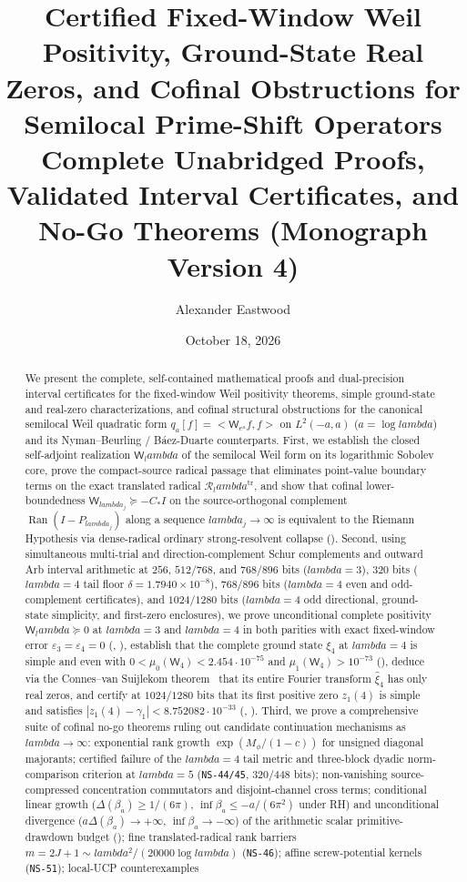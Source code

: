 \documentclass[11pt]{article}
\title{\textbf{Certified Fixed-Window Weil Positivity, Ground-State Real Zeros, and Cofinal Obstructions for Semilocal Prime-Shift Operators}\\[6pt]
\large Complete Unabridged Proofs, Validated Interval Certificates, and No-Go Theorems (Monograph Version 4)}
\author{Alexander Eastwood}
\date{October 18, 2026}
\def\lambda{lambda}%
\def\ip#1#2{<#1,#2>}%
\theoremstyle{remark}
\newcommand{\ip}[2]{\left\langle #1,#2\right\rangle}
\begin{document}
\maketitle

\begin{abstract}
We present the complete, self-contained mathematical proofs and dual-precision interval certificates for the fixed-window Weil positivity theorems, simple ground-state and real-zero characterizations, and cofinal structural obstructions for the canonical semilocal Weil quadratic form $q_a[f]=\ip{\mathsf W_{e^a}f}{f}$ on $L^2(-a,a)$ ($a=\log\lambda$) and its Nyman--Beurling / B\'aez-Duarte counterparts. First, we establish the closed self-adjoint realization $\mathsf W_\lambda$ of the semilocal Weil form on its logarithmic Sobolev core, prove the compact-source radical passage that eliminates point-value boundary terms on the exact translated radical $\mathcal R_\lambda^{\mathrm{tr}}$, and show that cofinal lower-boundedness $\mathsf W_{\lambda_j}\succeq -C_* I$ on the source-orthogonal complement $\operatorname{Ran}(I-P_{\lambda_j})$ along a sequence $\lambda_j\to\infty$ is equivalent to the Riemann Hypothesis via dense-radical ordinary strong-resolvent collapse (). Second, using simultaneous multi-trial and direction-complement Schur complements and outward Arb interval arithmetic at $256$, $512/768$, and $768/896$ bits ($\lambda=3$), $320$ bits ($\lambda=4$ tail floor $\delta=1.7940\times 10^{-8}$), $768/896$ bits ($\lambda=4$ even and odd-complement certificates), and $1024/1280$ bits ($\lambda=4$ odd directional, ground-state simplicity, and first-zero enclosures), we prove unconditional complete positivity $\mathsf W_\lambda\succeq 0$ at $\lambda=3$ and $\lambda=4$ in both parities with exact fixed-window error $\varepsilon_3=\varepsilon_4=0$ (, ), establish that the complete ground state $\xi_4$ at $\lambda=4$ is simple and even with $0<\mu_0(\mathsf W_4)<2.454\cdot 10^{-75}$ and $\mu_1(\mathsf W_4)>10^{-73}$ (), deduce via the Connes--van Suijlekom theorem~\cite{ConnesVanSuijlekom2025} that its entire Fourier transform $\widehat{\xi}_4$ has only real zeros, and certify at $1024/1280$ bits that its first positive zero $z_1(4)$ is simple and satisfies $|z_1(4)-\gamma_1|<8.752082\cdot 10^{-33}$ (, ). Third, we prove a comprehensive suite of cofinal no-go theorems ruling out candidate continuation mechanisms as $\lambda\to\infty$: exponential rank growth $\exp(M_\phi/(1-c))$ for unsigned diagonal majorants; certified failure of the $\lambda=4$ tail metric and three-block dyadic norm-comparison criterion at $\lambda=5$ (\texttt{NS-44/45}, $320/448$ bits); non-vanishing source-compressed concentration commutators and disjoint-channel cross terms; conditional linear growth ($\Delta(\beta_a)\ge 1/(6\pi)$, $\inf\beta_a\le -a/(6\pi^2)$ under RH) and unconditional divergence ($a\Delta(\beta_a)\to+\infty$, $\inf\beta_a\to-\infty$) of the arithmetic scalar primitive-drawdown budget (); fine translated-radical rank barriers $m=2J+1\sim \lambda^2/(20000\log\lambda)$ (\texttt{NS-46}); affine screw-potential kernels (\texttt{NS-51}); local-UCP counterexamples 
\end{abstract}
\end{document}
